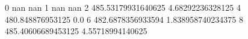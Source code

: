 0 nan nan
1 nan nan
2 485.53179931640625 4.68292236328125
4 480.848876953125 0.0
6 482.6878356933594 1.838958740234375
8 485.40606689453125 4.55718994140625
